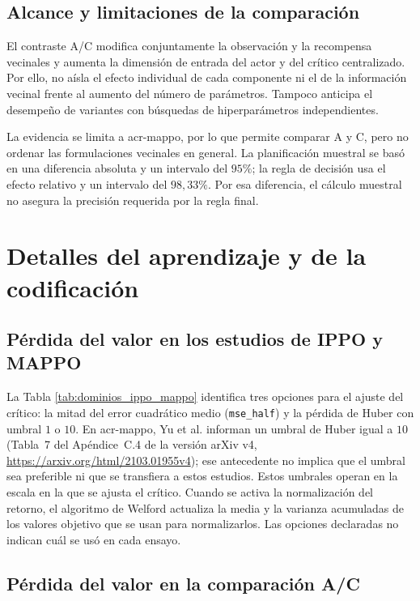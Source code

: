 \subsection{Alcance y limitaciones de la comparación}

El contraste A/C modifica conjuntamente la observación y la recompensa vecinales y aumenta la dimensión de entrada del actor y del crítico centralizado. Por ello, no aísla el efecto individual de cada componente ni el de la información vecinal frente al aumento del número de parámetros. Tampoco anticipa el desempeño de variantes con búsquedas de hiperparámetros independientes.

La evidencia se limita a \acrshort{acr-mappo}, por lo que permite comparar A y C, pero no ordenar las formulaciones vecinales en general. La planificación muestral se basó en una diferencia absoluta y un intervalo del $95\%$; la regla de decisión usa el efecto relativo y un intervalo del $98{,}33\%$. Por esa diferencia, el cálculo muestral no asegura la precisión requerida por la regla final.

\section{Detalles del aprendizaje y de la codificación}
\label{sec:apendice_detalles_aprendizaje}

\subsection{Pérdida del valor en los estudios de IPPO y MAPPO}
\label{subsec:perdida_valor_ippo_mappo}

La Tabla \ref{tab:dominios_ippo_mappo} identifica tres opciones para el ajuste del crítico: la mitad del error cuadrático medio (\texttt{mse\_half}) y la pérdida de Huber con umbral $1$ o $10$. En \acrshort{acr-mappo}, Yu et al. \cite{yu2022surprising} informan un umbral de Huber igual a $10$ (Tabla~7 del Apéndice~C.4 de la versión arXiv v4, \url{https://arxiv.org/html/2103.01955v4}); ese antecedente no implica que el umbral sea preferible ni que se transfiera a estos estudios. Estos umbrales operan en la escala en la que se ajusta el crítico. Cuando se activa la normalización del retorno, el algoritmo de Welford actualiza la media y la varianza acumuladas de los valores objetivo que se usan para normalizarlos. Las opciones declaradas no indican cuál se usó en cada ensayo.

\subsection{Pérdida del valor en la comparación A/C}
\label{subsec:perdida_valor_ac}

